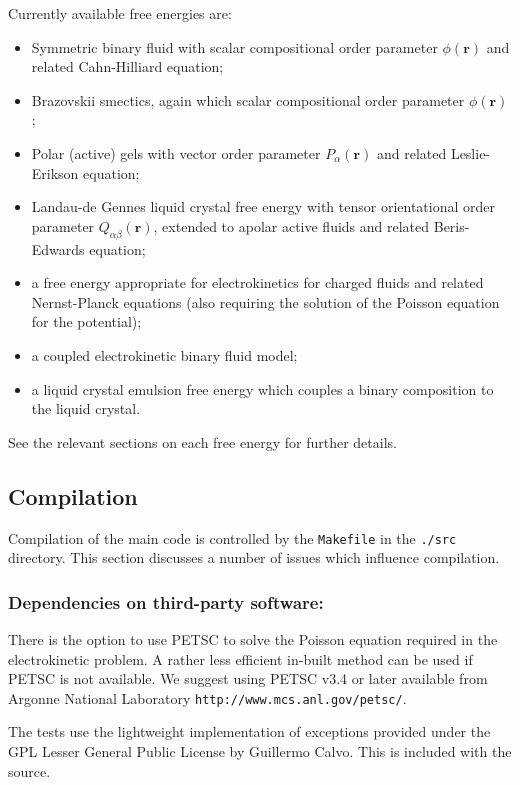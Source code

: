 Currently available free energies are:
\begin{itemize}
\item Symmetric binary fluid with scalar compositional order parameter
$\phi(\mathbf{r})$ and related Cahn-Hilliard equation;
\item Brazovskii smectics, again which scalar compositional order parameter
$\phi(\mathbf{r})$;
\item Polar (active) gels with vector order parameter $P_\alpha (\mathbf{r})$
and related Leslie-Erikson equation;
\item Landau-de Gennes liquid crystal free energy with tensor
orientational order parameter $Q_{\alpha\beta}(\mathbf{r})$, extended to
apolar active fluids and related Beris-Edwards equation;
\item a free energy appropriate for electrokinetics for charged fluids
and related Nernst-Planck equations (also requiring the solution of the
Poisson equation for the potential);
\item a coupled electrokinetic binary fluid model;
\item a liquid crystal emulsion free energy which couples a binary
composition to the liquid crystal.
\end{itemize}
See the relevant sections on each free energy for further details.

\subsection{Compilation}

Compilation of the main code is controlled by the \texttt{Makefile} in
the \texttt{./src} directory. This section discusses a number of issues
which influence compilation.

\subsubsection{Dependencies on third-party software:}
There is the option to use PETSC to solve the Poisson equation required in
the electrokinetic problem. A rather less efficient in-built method
can be used if PETSC is not available.
We suggest using PETSC
v3.4 or later available from Argonne National Laboratory
\texttt{http://www.mcs.anl.gov/petsc/}.

The tests use the lightweight implementation of exceptions provided
under the GPL Lesser General Public License by Guillermo Calvo. This
is included with the source.

